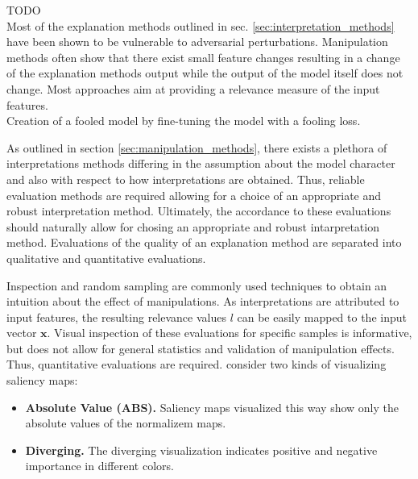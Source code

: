 TODO \\
Most of the explanation methods outlined in sec. \autoref{sec:interpretation_methods} have been shown to be vulnerable to adversarial perturbations. 
Manipulation methods often show that there exist small feature changes resulting in a change of the explanation methods output while the output of the model itself does not change. 
Most approaches aim at providing a relevance measure of the input features. \\

Creation of a fooled model by fine-tuning the model with a fooling loss. 


As outlined in section \autoref{sec:manipulation_methods}, there exists a plethora of interpretations methods differing in the assumption about the model character and also with respect to how interpretations are obtained. Thus, reliable evaluation methods are required allowing for a choice of an appropriate and robust interpretation method. Ultimately, the accordance to these evaluations should naturally allow for chosing an appropriate and robust intarpretation method.  
Evaluations of the quality of an explanation method are separated into qualitative and quantitative evaluations. 

Inspection and random sampling are commonly used techniques to obtain an intuition about the effect of manipulations. 
As interpretations are attributed to input features, the resulting relevance values $l$ can be easily mapped to the input vector $\mathbf{x}$. Visual inspection of these evaluations for specific samples is informative, but does not allow for general statistics and validation of manipulation effects. Thus, quantitative evaluations are required. 
\cite{adebayo2018sanity} consider two kinds of visualizing saliency maps: 
\begin{itemize}
    \item \textbf{Absolute Value (ABS).} Saliency maps visualized this way show only the absolute values of the normalizem maps.
    \item \textbf{Diverging. } The diverging visualization indicates positive and negative importance in different colors. 
\end{itemize}

